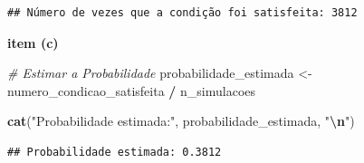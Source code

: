 \documentclass[
]{book}
\newenvironment{Shaded}{\begin{snugshade}}{\end{snugshade}}
\newcommand{\CommentTok}[1]{\textcolor[rgb]{0.56,0.35,0.01}{\textit{#1}}}
\newcommand{\FunctionTok}[1]{\textcolor[rgb]{0.13,0.29,0.53}{\textbf{#1}}}
\newcommand{\NormalTok}[1]{#1}
\newcommand{\OtherTok}[1]{\textcolor[rgb]{0.56,0.35,0.01}{#1}}
\newcommand{\SpecialCharTok}[1]{\textcolor[rgb]{0.81,0.36,0.00}{\textbf{#1}}}
\newcommand{\StringTok}[1]{\textcolor[rgb]{0.31,0.60,0.02}{#1}}
\begin{document}
\begin{verbatim}
## Número de vezes que a condição foi satisfeita: 3812
\end{verbatim}

\textbf{item (c)}

\begin{Shaded}
\begin{Highlighting}[]
\CommentTok{\# Estimar a Probabilidade}
\NormalTok{probabilidade\_estimada }\OtherTok{\textless{}{-}}\NormalTok{ numero\_condicao\_satisfeita }\SpecialCharTok{/}\NormalTok{ n\_simulacoes}

\FunctionTok{cat}\NormalTok{(}\StringTok{"Probabilidade estimada:"}\NormalTok{, probabilidade\_estimada, }\StringTok{"}\SpecialCharTok{\textbackslash{}n}\StringTok{"}\NormalTok{)}
\end{Highlighting}
\end{Shaded}

\begin{verbatim}
## Probabilidade estimada: 0.3812
\end{verbatim}

  
\end{document}
